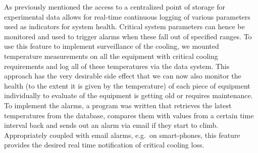 As previously mentioned the access to a centralized point of storage
for experimental data allows for real-time continuous logging of
various parameters used as indicators for system health. Critical
system parameters can hence be monitored and used to trigger alarms
when these fall out of specified ranges. %
To use this feature to implement surveillance of the cooling, we
mounted temperature measurements on all the equipment with critical
cooling requirements and log all of these temperatures via the data
system. This approach has the very desirable side effect that we can
now also monitor the health (to the extent it is given by the
temperature) of each piece of equipment individually to evaluate of
the equipment is getting old or requires maintenance. To implement the
alarms, a program was written that retrieves the latest temperatures
from the database, compares them with values from a certain time
interval back and sends out an alarm via email if they start to
climb. Appropriately coupled with email alarms, e.g.\ on smart-phones,
this feature provides the desired real time notification of critical
cooling loss.
